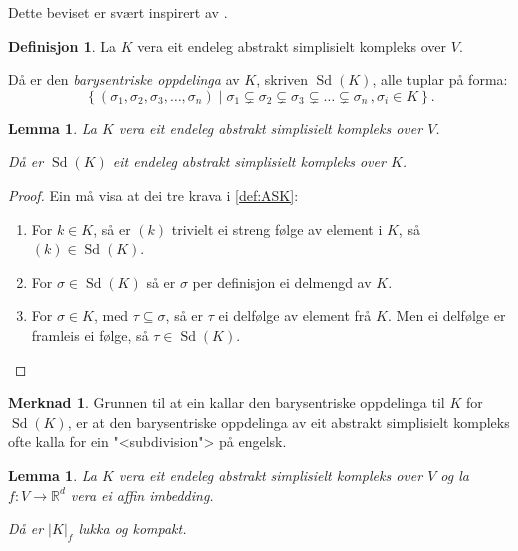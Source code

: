 \documentclass[a4paper, 12pt, norsk]{article}
\theoremstyle{plain}
\newtheorem{lemma}[theorem]{Lemma}
\theoremstyle{definition}
\newtheorem{definition}[theorem]{Definisjon}
\newtheorem{remark}[theorem]{Merknad}
\newcommand{\Rb}{\mathbb{R}}
\newcommand{\gr}[1]{ \lvert #1 \rvert } %
\newcommand{\set}[1]{ \left\{ #1 \right\} } %
\newcommand{\tuple}[1]{ \left( #1 \right) } %
\DeclareMathOperator{\Sd}{Sd} %
\begin{document}
Dette beviset er svært inspirert av \cite[Section 3]{https://doi.org/10.48550/arxiv.2203.03571}.

\begin{definition}
	La \( K \) vera eit endeleg abstrakt simplisielt kompleks over \( V \). 
	
	Då er den \emph{barysentriske oppdelinga} av \( K \), skriven \( \Sd(K) \), alle tuplar på forma: 
	\[
		\set{(\sigma_1, \sigma_2, \sigma_3, \dots, \sigma_n) \mid \sigma_1 \subsetneq \sigma_2 \subsetneq \sigma_3 \subsetneq \dots \subsetneq \sigma_n\,, \sigma_i \in K}.
	\]
\end{definition}

\begin{lemma} \label{thm:subdivisjon-abstrakt-simplisielt-kompleks}
	La \( K \) vera eit endeleg abstrakt simplisielt kompleks over \( V \).
	
	Då er \( \Sd(K) \) eit endeleg abstrakt simplisielt kompleks over \( K \).
\end{lemma}

\begin{proof}
	Ein må visa at dei tre krava i \autoref{def:ASK}:
	\begin{enumerate}
		\item{ For \( k \in K \), så er \( \tuple{k} \) trivielt ei streng følge av element i \( K \), så \( \tuple{k} \in \Sd(K) \). }
  		\item{ For \( \sigma \in \Sd(K) \) så er \( \sigma \) per definisjon ei delmengd av \( K \). }
    	\item{ For \( \sigma \in K \), med \( \tau \subseteq \sigma \), så er \( \tau \) ei delfølge av element frå \( K \). Men ei delfølge er framleis ei følge, så \( \tau \in \Sd(K) \). }
	\end{enumerate}
\end{proof}

\begin{remark}
	Grunnen til at ein kallar den barysentriske oppdelinga til \( K \) for \( \Sd(K) \), er at den barysentriske oppdelinga av eit abstrakt simplisielt kompleks ofte kalla for ein "<subdivision"> på engelsk.
\end{remark}

\begin{lemma} \label{thm:geometrisk-kompleks-lukka}
	La \( K \) vera eit endeleg abstrakt simplisielt kompleks over \( V \) og la \( f: V \to \Rb^d \) vera ei affin imbedding.
	
	Då er \( \gr{K}_f \) lukka og kompakt.
\end{lemma}
\end{document}
